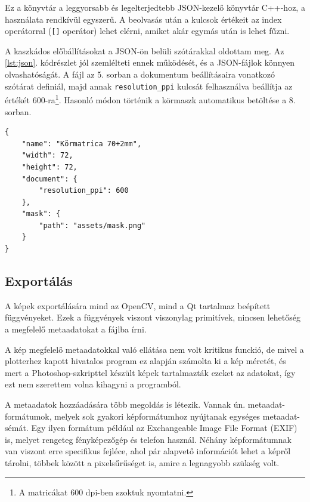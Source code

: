 Ez a könyvtár a leggyorsabb és legelterjedtebb JSON-kezelő könyvtár C++-hoz, a használata rendkívül egyszerű. A beolvasás után a kulcsok értékeit az index operátorral (\texttt{[]} operátor) lehet elérni, amiket akár egymás után is lehet fűzni.

A kaszkádos előbállításokat a JSON-ön belüli szótárakkal oldottam meg. Az \ref{lst:json}. kódrészlet jól szemlélteti ennek működését, és a JSON-fájlok könnyen olvashatóságát. A fájl az 5. sorban a dokumentum beállításaira vonatkozó szótárat definiál, majd annak \texttt{resolution\_ppi} kulcsát felhasználva beállítja az értékét 600-ra\footnote[4]{A matricákat 600 dpi-ben szoktuk nyomtatni.}. Hasonló módon történik a körmaszk automatikus betöltése a 8. sorban.

\begin{listing}[!h]
    \caption{Példa JSON-fájl egy körmatrica előbállításhoz.}
    \label{lst:json}
    \begin{verbatim}
{
    "name": "Körmatrica 70+2mm",
    "width": 72,
    "height": 72,
    "document": {
        "resolution_ppi": 600
    },
    "mask": {
        "path": "assets/mask.png"
    }
}
    \end{verbatim}
\end{listing}

\subsection{Exportálás}

A képek exportálására mind az OpenCV, mind a Qt tartalmaz beépített függvényeket. Ezek a függvények viszont viszonylag primitívek, nincsen lehetőség a megfelelő metaadatokat a fájlba írni. 

A kép megfelelő metaadatokkal való ellátása nem volt kritikus funckió, de mivel a plotterhez kapott hivatalos program ez alapján számolta ki a kép méretét, és mert a Photoshop-szkripttel készült képek tartalmazták ezeket az adatokat, így ezt nem szerettem volna kihagyni a programból.

A metaadatok hozzáadására több megoldás is létezik. Vannak ún. metaadat-formátumok, melyek sok gyakori képformátumhoz nyújtanak egységes metaadat-sémát. Egy ilyen formátum például az Exchangeable Image File Format (EXIF) is, melyet rengeteg fényképezőgép és telefon használ. Néhány képformátumnak van viszont erre specifikus fejléce, ahol pár alapvető információt lehet a képről tárolni, többek között a pixelsűrűséget is, amire a legnagyobb szükség volt.

